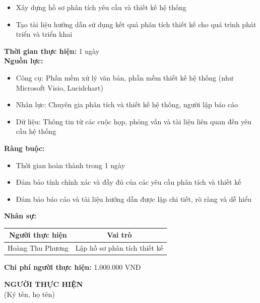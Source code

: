 {\begin{minipage}{\textwidth}
\begin{itemize}
        \item Xây dựng hồ sơ phân tích yêu cầu và thiết kế hệ thống
        \item Tạo tài liệu hướng dẫn sử dụng kết quả phân tích thiết kế cho quá trình phát triển và triển khai
    \end{itemize}
    \vspace{0.5cm}
    \noindent \textbf{Thời gian thực hiện:} 1 ngày \\
    \noindent \textbf{Nguồn lực:}
    \begin{itemize}
        \item Công cụ: Phần mềm xử lý văn bản, phần mềm thiết kế hệ thống (như Microsoft Visio, Lucidchart)
        \item Nhân lực: Chuyên gia phân tích và thiết kế hệ thống, người lập báo cáo
        \item Dữ liệu: Thông tin từ các cuộc họp, phỏng vấn và tài liệu liên quan đến yêu cầu hệ thống
    \end{itemize}
    \vspace{0.5cm}
    \noindent \textbf{Ràng buộc:}
    \begin{itemize}
        \item Thời gian hoàn thành trong 1 ngày
        \item Đảm bảo tính chính xác và đầy đủ của các yêu cầu phân tích và thiết kế
        \item Đảm bảo báo cáo và tài liệu hướng dẫn được lập chi tiết, rõ ràng và dễ hiểu
    \end{itemize}
    \vspace{0.5cm}
    \noindent \textbf{Nhân sự:}
    \begin{longtable}{|c|c|}
    \hline
    \textbf{Người thực hiện} & \textbf{Vai trò} \\
    \hline
    Hoàng Thu Phương & Lập hồ sơ phân tích thiết kế \\
    \hline
    \end{longtable}
    \vspace{0.5cm}
    \noindent \textbf{Chi phí người thực hiện:} 1.000.000 VNĐ
    \vspace{1cm}
    \begin{flushleft}
        \hspace{8cm} \textbf{NGƯỜI THỰC HIỆN} \\
        \hspace{8.8cm} (Ký tên, họ tên) \\
        \vspace{1cm}
    \end{flushleft}
    \end{minipage}
}
% 
